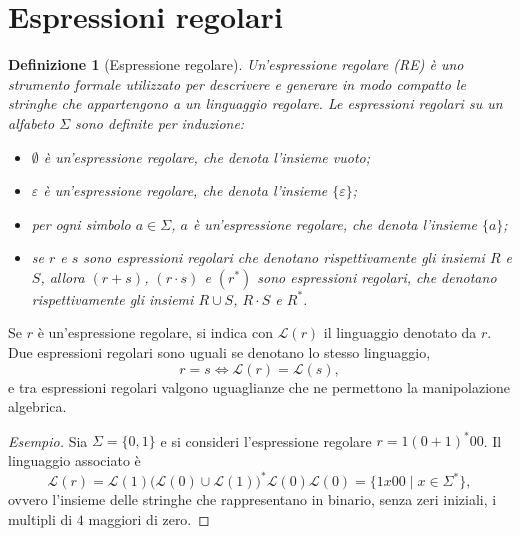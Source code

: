 \documentclass[a4paper, 11pt, oneside]{book}
\theoremstyle{formale}
\newtheorem*{definition}{Definizione}
\newenvironment{esempio}
    {\begin{proof}[\textit{Esempio}]\renewcommand{\qedsymbol}{$\diamond$}}
    {\end{proof}}
\begin{document}
    \section{Espressioni regolari}
    \begin{definition}[Espressione regolare]
        Un'\emph{espressione regolare} (RE) \`e uno strumento formale utilizzato per
        descrivere e generare in modo compatto le stringhe che appartengono a un
        linguaggio regolare. Le espressioni regolari su un alfabeto $\Sigma$ sono definite
        per induzione:
        \begin{itemize}
            \item $\emptyset$ \`e un'espressione regolare, che denota l'insieme vuoto;
            \item $\varepsilon$ \`e un'espressione regolare, che denota l'insieme
                $\{\varepsilon\}$;
            \item per ogni simbolo $a \in \Sigma$, $a$ \`e un'espressione regolare, che
                denota l'insieme $\{a\}$;
            \item se $r$ e $s$ sono espressioni regolari che denotano rispettivamente gli
                insiemi $R$ e $S$, allora $(r + s)$, $(r \cdot s)$ e $(r^*)$ sono
                espressioni regolari, che denotano rispettivamente gli insiemi $R \cup S$,
                $R \cdot S$ e $R^*$.
        \end{itemize}
    \end{definition}

    Se $r$ \`e un'espressione regolare, si indica con $\mathcal{L}(r)$ il linguaggio
    denotato da $r$. Due espressioni regolari sono uguali se denotano lo stesso
    linguaggio,
    \begin{equation*}
        r = s \iff \mathcal{L}(r) = \mathcal{L}(s),
    \end{equation*}
    e tra espressioni regolari valgono uguaglianze che ne permettono la manipolazione
    algebrica.

    \begin{esempio}
        Sia $\Sigma = \{0, 1\}$ e si consideri l'espressione regolare $r = 1(0 + 1)^*00$.
        Il linguaggio associato \`e
        \begin{equation*}
            \mathcal{L}(r)
            = \mathcal{L}(1) \bigl(\mathcal{L}(0) \cup \mathcal{L}(1)\bigr)^*
                \mathcal{L}(0) \mathcal{L}(0)
            = \{1x00 \mid x \in \Sigma^*\},
        \end{equation*}
        ovvero l'insieme delle stringhe che rappresentano in binario, senza zeri
        iniziali, i multipli di $4$ maggiori di zero.
    \end{esempio}
\end{document}
